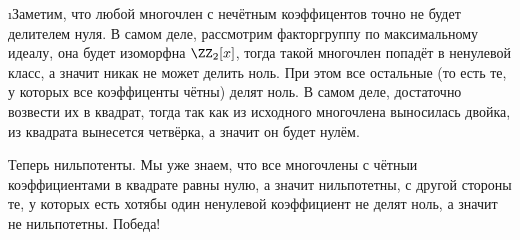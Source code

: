 \i Заметим, что любой многочлен с нечётным коэффицентов точно не будет делителем нуля. В самом деле, рассмотрим факторгруппу по максимальному идеалу, она будет изоморфна $\ZZ_2[x]$, тогда такой многочлен попадёт в ненулевой класс, а значит никак не может делить ноль. При этом все остальные (то есть те, у которых все коэффиценты чётны) делят ноль. В самом деле, достаточно возвести их в квадрат, тогда так как из исходного многочлена выносилась двойка, из квадрата вынесется четвёрка, а значит он будет нулём.
\par Теперь нильпотенты. Мы уже знаем, что все многочлены с чётныи коэффициентами в квадрате равны нулю, а значит нильпотетны, с другой стороны те, у которых есть хотябы один ненулевой коэффициент не делят ноль, а значит не нильпотетны. Победа!